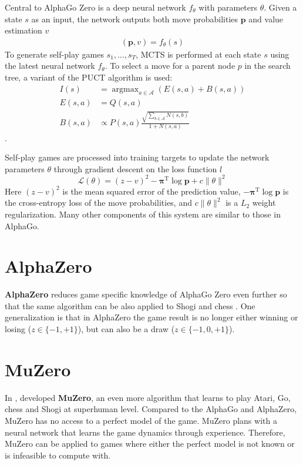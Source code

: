 Central to AlphaGo Zero is a deep neural network $f_\theta$ with parameters $\theta$.
Given a state $s$ as an input, the network outputs both move probabilities $\pmb{p}$ and value estimation $v$
\begin{align*}
    (\mathbf{p}, v) = f_\theta(s)
\end{align*}
To generate self-play games $s_1, ..., s_T$, MCTS is performed at each state $s$ using the latest neural network $f_\theta$.
To select a move for a parent node $p$ in the search tree, a variant of the PUCT algorithm is used:
\begin{align*}
    I(s)     & = \operatorname{argmax}_{a \in \mathcal{A}} \left( E(s, a) + B(s, a) \right)  \\
    E(s, a)  & = Q(s, a)  \\
    B(s, a)  & \propto P(s, a) \frac{\sqrt{\sum_{b \in \mathcal{A}}{N(s, b)}}}{1+N(s, a)}
\end{align*} \label{sec:puct}.

Self-play games are processed into training targets to update the network parameters $\theta$ through gradient descent on the loss function $l$
\begin{equation*}
    \mathcal{L}(\theta) = (z-v)^{2} - \pmb{\pi}^{\mathrm{T}} \log \pmb{p}+c\|\theta\|^{2}
\end{equation*}
Here $(z-v)^2$ is the mean squared error of the prediction value,
$-\pmb{\pi}^{\mathrm{T}} \log \pmb{p}$ is the cross-entropy loss of the move probabilities,
and $c\|\theta\|^2$ is a $L_2$ weight regularization.
Many other components of this system are similar to those in AlphaGo.

\section{AlphaZero}
\textbf{AlphaZero} reduces game specific knowledge of AlphaGo Zero even further so that the same algorithm can be also applied to Shogi and chess
\cite{MasteringChessShogi_Silver.Hubert.ea_2017}.
One generalization is that in AlphaZero the game result is no longer either winning or losing ($z \in \{ -1, +1 \}$), but can also be a draw ($z \in \{-1, 0, +1 \}$).

\section{MuZero} \label{sec:muzero}
In \citeyear{MasteringAtariGo_Schrittwieser.Antonoglou.ea_2020},
\citeauthor{MasteringAtariGo_Schrittwieser.Antonoglou.ea_2020} developed
\textbf{MuZero}, an even more algorithm that learns to play Atari, Go, chess and Shogi at superhuman level.
Compared to the AlphaGo and AlphaZero,
MuZero has no access to a perfect model of the game.
MuZero plans with a neural network that learns the game dynamics through experience.
Therefore, MuZero can be applied to games where either the perfect model is not known or is infeasible to compute with.

